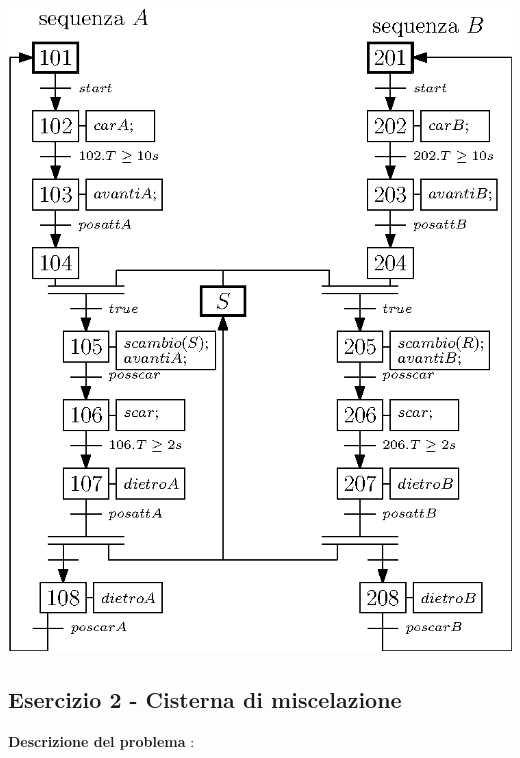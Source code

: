\documentclass[10pt, letterpaper]{report}
\begin{document}
\begin{center}
    \includegraphics[width=1\textwidth ]{images/SFCCarrelli3.eps}
\end{center}
\subsection{Esercizio 2 - Cisterna di miscelazione}
\textbf{Descrizione del problema} : 
\end{document}
